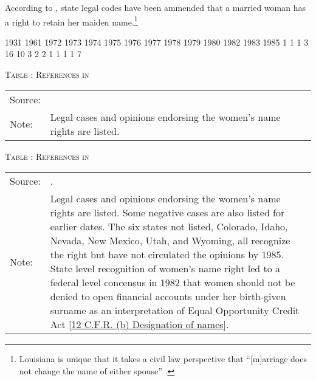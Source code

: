 According to \citet[][p.8]{Augustine1997}, state legal codes have been ammended that a married woman has a right to retain her maiden name.\footnote{Louisiana is unique that it takes a civil law perspective that ``[m]arriage does not change the name of either spouse'' \citep[][p.8]{Augustine1997}. }





\begin{Schunk}
\begin{Soutput}

1931 1961 1972 1973 1974 1975 1976 1977 1978 1979 1980 1982 1983 1985 
   1    1    1    3   16   10    3    2    2    1    1    1    1    7 
\end{Soutput}
\end{Schunk}




\clearpage
\hfil\textsc{Table \thetable: References in \citet{Augustine1997}\label{TabAFn18}}\\
\setlength{\tabcolsep}{1pt}
\hfil

\hfil\begin{tabular}{>{\hfill\footnotesize }p{}<{}>{\footnotesize }p{}<{\hfill}}
Source: & \citet{Augustine1997}\\
Note: & Legal cases and opinions endorsing the women's name rights are listed. 
\end{tabular}
\vspace{4ex}

\clearpage
\setcounter{table}{1}
\hfil\textsc{Table \thetable: References in \citet{MacDougall1985}\label{TabMFn9}}\\
\setlength{\tabcolsep}{1pt}
\hfil

\hfil\begin{tabular}{>{\hfill\footnotesize }p{}<{}>{\footnotesize }p{}<{\hfill}}
Source: & \citet{MacDougall1985}.\\
Note: & Legal cases and opinions endorsing the women's name rights are listed. Some negative cases are also listed for earlier dates. The six states not listed, Colorado, Idaho, Nevada, New Mexico, Utah, and Wyoming, all recognize the right but have not circulated the opinions by 1985. State level recognition of women's name right led to a federal level concensus in 1982 that women should not be denied to open financial accounts under her birth-given surname as an interpretation of Equal Opportunity Credit Act [\href{https://www.ecfr.gov/current/title-12/chapter-II/subchapter-A/part-202/section-202.7#p-202.7(b)}{12 C.F.R. \textsection 202.7 (b) Designation of names}].
\end{tabular}

